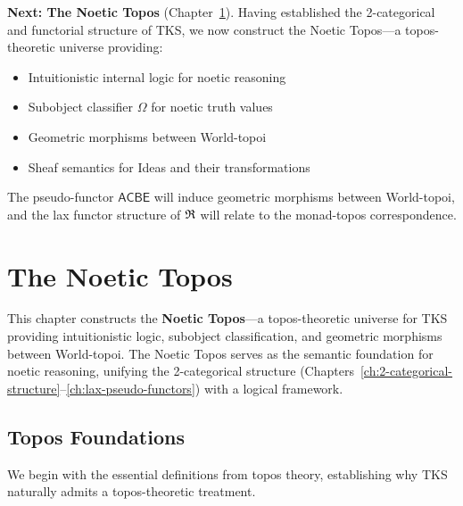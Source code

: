 \begin{remark}
\textbf{Next: The Noetic Topos} (Chapter~\ref{ch:noetic-topos}).
Having established the 2-categorical and functorial structure of TKS, we now
construct the Noetic Topos---a topos-theoretic universe providing:
\begin{itemize}
  \item Intuitionistic internal logic for noetic reasoning
  \item Subobject classifier $\Omega$ for noetic truth values
  \item Geometric morphisms between World-topoi
  \item Sheaf semantics for Ideas and their transformations
\end{itemize}
The pseudo-functor $\mathsf{ACBE}$ will induce geometric morphisms between
World-topoi, and the lax functor structure of $\mathfrak{R}$ will relate to the
monad-topos correspondence.
\end{remark}

\chapter{The Noetic Topos}
\label{ch:noetic-topos}

\begin{tcolorbox}[colback=blue!5!white,colframe=blue!75!black,title=\vnewthree]
This chapter constructs the \textbf{Noetic Topos}---a topos-theoretic universe
for TKS providing intuitionistic logic, subobject classification, and geometric
morphisms between World-topoi. The Noetic Topos serves as the semantic foundation
for noetic reasoning, unifying the 2-categorical structure (Chapters~\ref{ch:2-categorical-structure}--\ref{ch:lax-pseudo-functors})
with a logical framework.
\end{tcolorbox}

\section{Topos Foundations}
\label{sec:review-topos}

We begin with the essential definitions from topos theory, establishing why
TKS naturally admits a topos-theoretic treatment.

